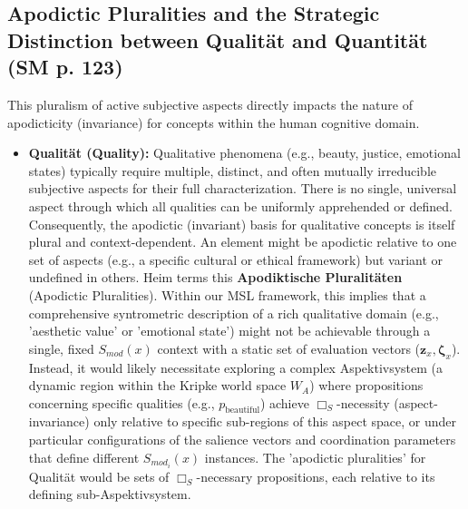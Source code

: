 \documentclass[
    12pt,              %
    a4paper,           %
    headings=normal,   %
    twoside=true,      %
    BCOR=8mm,          %
]{scrbook}
\newcommand{\BoxS}{\Box_S}
\begin{document}
\subsection{Apodictic Pluralities and the Strategic Distinction between Qualität and Quantität (SM p. 123)}
\label{sec:ch7_1_3_apodikt_plural_qual_quant}
This pluralism of active subjective aspects directly impacts the nature of apodicticity (invariance) for concepts within the human cognitive domain.
\begin{itemize}
    \item   \textbf{Qualität (Quality):} Qualitative phenomena (e.g., beauty, justice, emotional states) typically require multiple, distinct, and often mutually irreducible subjective aspects for their full characterization. There is no single, universal aspect through which all qualities can be uniformly apprehended or defined. Consequently, the apodictic (invariant) basis for qualitative concepts is itself plural and context-dependent. An element might be apodictic relative to one set of aspects (e.g., a specific cultural or ethical framework) but variant or undefined in others. Heim terms this \textbf{Apodiktische Pluralitäten} (Apodictic Pluralities).
        Within our MSL framework, this implies that a comprehensive syntrometric description of a rich qualitative domain (e.g., 'aesthetic value' or 'emotional state') might not be achievable through a single, fixed \(S_{mod}(x)\) context with a static set of evaluation vectors (\(\mathbf{z}_x, \mathbf{\zeta}_x\)). Instead, it would likely necessitate exploring a complex Aspektivsystem (a dynamic region within the Kripke world space \(W_A\)) where propositions concerning specific qualities (e.g., \(p_{\text{beautiful}}\)) achieve \(\BoxS\)-necessity (aspect-invariance) only relative to specific sub-regions of this aspect space, or under particular configurations of the salience vectors and coordination parameters that define different \(S_{mod_i}(x)\) instances. The 'apodictic pluralities' for Qualität would be sets of \(\BoxS\)-necessary propositions, each relative to its defining sub-Aspektivsystem.


\end{itemize}
\end{document}
